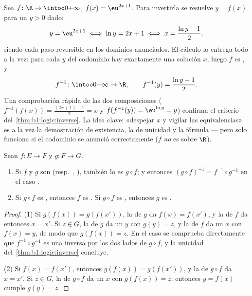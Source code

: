 \begin{example}\label{ex:b1:logic:inversecomp}
Sea $f \colon \R \to \intoo0{+\infty}$, $f(x) = \eu^{2x+1}$. Para
invertirla se resuelve $y = f(x)$ para un $y > 0$ dado:
\[
y = \eu^{2x+1} \iff \ln y = 2x + 1 \iff x = \frac{\ln y - 1}2 ,
\]
siendo cada paso reversible en los dominios anunciados. El cálculo lo
entrega todo a la vez: para cada $y$ del codominio hay exactamente una
solución $x$, luego $f$ es , y
\[
f^{-1} \colon \intoo0{+\infty} \to \R,
\qquad
f^{-1}(y) = \frac{\ln y - 1}2 .
\]
Una comprobación rápida de las dos composiciones ($f^{-1}(f(x)) =
\frac{(2x+1) - 1}2 = x$ y $f(f^{-1}(y)) = \eu^{\ln y} = y$) confirma el
criterio del~\cref{thm:b1:logic:inverse}. La idea clave: «despejar $x$ y
vigilar las equivalencias» es a la vez la demostración de existencia, la
de unicidad y la fórmula --- pero solo funciona si el codominio se
anunció correctamente ($f$ \emph{no} es  sobre $\R$).
\end{example}

\begin{proposition}\label{prop:b1:logic:comp}
Sean $f \colon E \to F$ y $g \colon F \to G$.
\begin{enumerate}
  \item Si $f$ y $g$ son  (resp.\ ,
        ), también lo es $g \circ f$; y entonces
        $(g \circ f)^{-1} = f^{-1} \circ g^{-1}$ en el caso
        .
  \item Si $g \circ f$ es , entonces $f$ es . Si
        $g \circ f$ es , entonces $g$ es .
\end{enumerate}
\end{proposition}

\begin{proof}
(1) Si $g(f(x)) = g(f(x'))$, la  de $g$ da $f(x) = f(x')$, y
la de $f$ da entonces $x = x'$. Si $z \in G$, la  de $g$
da un $y$ con $g(y) = z$, y la de $f$ da un $x$ con $f(x) = y$, de modo
que $g(f(x)) = z$. En el caso  se comprueba directamente que
$f^{-1} \circ g^{-1}$ es una inversa por los dos lados de $g \circ f$, y
la unicidad del~\cref{thm:b1:logic:inverse} concluye.

(2) Si $f(x) = f(x')$, entonces $g(f(x)) = g(f(x'))$, y la 
de $g \circ f$ da $x = x'$. Si $z \in G$, la  de
$g \circ f$ da un $x$ con $g(f(x)) = z$: entonces $y = f(x)$ cumple
$g(y) = z$.
\end{proof}

